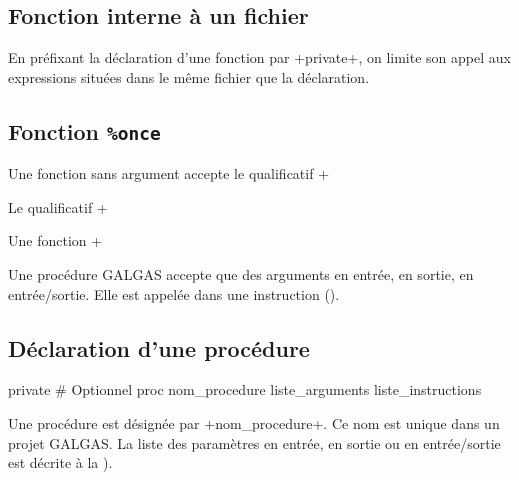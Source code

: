 \subsection{Fonction interne à un fichier}

En préfixant la déclaration d'une fonction par \ggs+private+, on limite son appel aux expressions situées dans le même fichier que la déclaration.




\subsection{Fonction \texttt{\%once}}

Une fonction sans argument accepte le qualificatif \ggs+%


Le qualificatif \ggs+%

Une fonction \ggs+%







Une procédure GALGAS accepte que des arguments en entrée, en sortie, en entrée/sortie. Elle est appelée dans une instruction ().

\subsection{Déclaration d'une procédure}

\begin{galgascode}
private # Optionnel
proc nom_procedure liste_arguments {
  liste_instructions
}
\end{galgascode}

Une procédure est désignée par \ggs+nom_procedure+. Ce nom est unique dans un projet GALGAS. La liste des paramètres en entrée, en sortie ou en entrée/sortie est décrite à la ).

